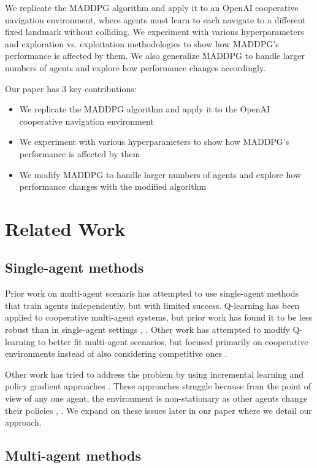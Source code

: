 \documentclass{article}
\begin{document}
We replicate the MADDPG algorithm and apply it to an OpenAI cooperative navigation environment, where agents must learn to each navigate to a different fixed landmark without colliding. We experiment with various hyperparameters and exploration vs. exploitation methodologies to show how MADDPG's performance is affected by them. We also generalize MADDPG to handle larger numbers of agents and explore how performance changes accordingly.

Our paper has 3 key contributions:
\begin{itemize}[nosep]
\item We replicate the MADDPG algorithm and apply it to the OpenAI cooperative navigation environment
\item We experiment with various hyperparameters to show how MADDPG's performance is affected by them
\item We modify MADDPG to handle larger numbers of agents and explore how performance changes with the modified algorithm
\end{itemize}

\section{Related Work}
\subsection{Single-agent methods}
Prior work on multi-agent scenaris has attempted to use single-agent methods that train agents independently, but with limited success. Q-learning has been applied to cooperative multi-agent systems, but prior work has found it to be less robust than in single-agent settings \cite{sandholm1996}, \cite{claus1998dynamics}. Other work has attempted to modify Q-learning to better fit multi-agent scenarios, but focused primarily on cooperative environments instead of also considering competitive ones \cite{cooperativeQ}.

Other work has tried to address the problem by using incremental learning and policy gradient approaches \cite{buffet2007}. These approaches struggle because from the point of view of any one agent, the environment is non-stationary as other agents change their policies \cite{busoniu2008comprehensive}, \cite{bucsoniu2010multi}. We expand on these issues later in our paper where we detail our approach.

\subsection{Multi-agent methods}
\end{document}
